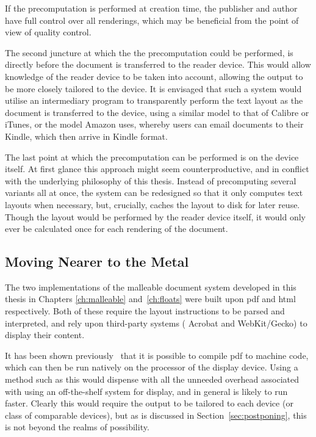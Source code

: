 If the precomputation is performed at creation time, the publisher and author have full control over all renderings, which may be beneficial from the point of view of quality control. 

The second juncture at which the the precomputation could be performed, is directly before the document is transferred to the reader device. This would allow knowledge of the reader device to be taken into account, allowing the output to be more closely tailored to the device. It is envisaged that such a system would utilise an intermediary program to transparently perform the text layout as the document is transferred to the device, using a similar model to that of Calibre or iTunes, or the model Amazon uses, whereby users can email documents to their Kindle, which then arrive in Kindle format.

The last point at which the precomputation can be performed is on the device itself. At first glance this approach might seem counterproductive, and in conflict with the underlying philosophy of this thesis. Instead of precomputing several variants all at once, the system can be redesigned so that it only computes text layouts when necessary, but, crucially, caches the layout to disk for later reuse. Though the layout would be performed by the \ebook{} reader device itself, it would only ever be calculated once for each rendering of the document.

\subsection{Moving Nearer to the Metal}
The two implementations of the malleable document system developed in this thesis in Chapters \ref{ch:malleable} and~\ref{ch:floats} were built upon \gls{pdf} and \gls{html} respectively. Both of these require the layout instructions to be parsed and interpreted, and rely upon third-party systems (\ie{} Acrobat and WebKit/Gecko) to display their content.

It has been shown previously~\cite{Bagley2010} that it is possible to compile \gls{pdf} to machine code, which can then be run natively on the processor of the display device. Using a method such as this would dispense with all the unneeded overhead associated with using an off-the-shelf system for display, and in general is likely to run faster. Clearly this would require the output to be tailored to each device (or class of comparable devices), but as is discussed in Section~\ref{sec:postponing}, this is not beyond the realms of possibility.



